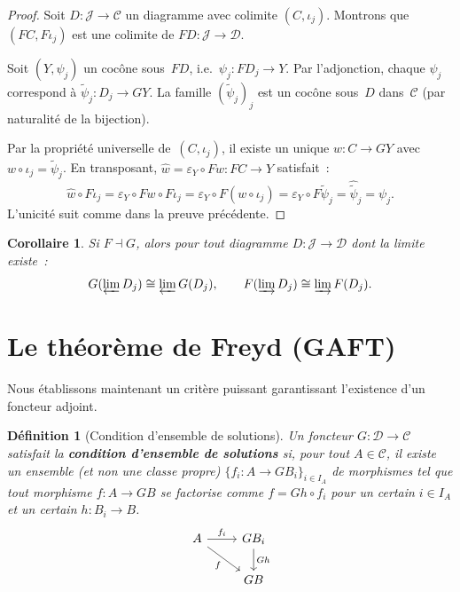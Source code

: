 \documentclass[a4paper,12pt]{book}
\newtheorem{corollaire}[theoreme]{Corollaire}
\newtheorem{definition}[theoreme]{Définition}
\begin{document}
\begin{proof}
Soit $D\colon\mathcal{J}\to\mathcal{C}$ un diagramme avec colimite
$(C,\iota_j)$. Montrons que $(FC,F\iota_j)$ est une colimite de
$FD\colon\mathcal{J}\to\mathcal{D}$.

Soit $(Y,\psi_j)$ un cocône sous~$FD$, i.e.\ $\psi_j\colon FD_j\to Y$.
Par l'adjonction, chaque $\psi_j$ correspond à
$\tilde{\psi}_j\colon D_j\to GY$.
La famille $(\tilde{\psi}_j)_j$ est un cocône sous~$D$ dans~$\mathcal{C}$
(par naturalité de la bijection).

Par la propriété universelle de~$(C,\iota_j)$, il existe un unique
$w\colon C\to GY$ avec $w\circ\iota_j = \tilde{\psi}_j$.
En transposant, $\hat{w} = \varepsilon_Y\circ Fw\colon FC\to Y$ satisfait~:
\[
    \hat{w}\circ F\iota_j
    = \varepsilon_Y\circ Fw\circ F\iota_j
    = \varepsilon_Y\circ F(w\circ\iota_j)
    = \varepsilon_Y\circ F\tilde{\psi}_j
    = \hat{\tilde{\psi}}_j = \psi_j.
\]
L'unicité suit comme dans la preuve précédente.
\end{proof}

\begin{corollaire}\label{cor:adj-hom-lim}
Si $F\dashv G$, alors pour tout diagramme $D\colon\mathcal{J}\to\mathcal{D}$
dont la limite existe~:
\[
    G(\varprojlim D_j) \cong \varprojlim G(D_j),
    \qquad
    F(\varinjlim D_j) \cong \varinjlim F(D_j).
\]
\end{corollaire}


\section{Le théorème de Freyd (GAFT)}\label{sec:freyd}

Nous établissons maintenant un critère puissant garantissant l'existence
d'un foncteur adjoint.

\begin{definition}[Condition d'ensemble de solutions]\label{def:solution-set}
Un foncteur $G\colon\mathcal{D}\to\mathcal{C}$ satisfait la
\textbf{condition d'ensemble de solutions} si, pour tout $A\in\mathcal{C}$,
il existe un ensemble (et non une classe propre)
$\{f_i\colon A\to GB_i\}_{i\in I_A}$ de morphismes tel que tout morphisme
$f\colon A\to GB$ se factorise comme $f = Gh\circ f_i$ pour un certain
$i\in I_A$ et un certain $h\colon B_i\to B$.
\[
\begin{tikzcd}
A \arrow[r, "f_i"] \arrow[dr, "f"'] & GB_i \arrow[d, "Gh"] \\
& GB
\end{tikzcd}
\]
\end{definition}
\end{document}
